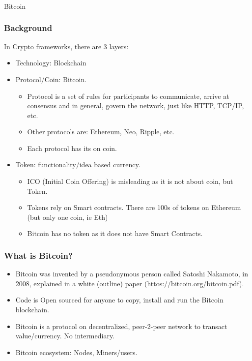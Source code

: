 \begin{frame}[fragile]\frametitle{}
\begin{center}
{\Large Bitcoin}
\end{center}
\end{frame}

\begin{frame}[fragile]\frametitle{Background}
In Crypto frameworks, there are 3 layers:
\begin{itemize}
\item Technology: Blockchain
\item Protocol/Coin: Bitcoin. 
\begin{itemize}
\item Protocol is a set of rules for participants to communicate, arrive at consensus and in general, govern the network, just like HTTP, TCP/IP, etc. 
\item Other protocols are: Ethereum, Neo, Ripple, etc. 
\item Each protocol has its on coin.
\end{itemize}
\item Token: functionality/idea based currency.
\begin{itemize}
\item ICO (Initial Coin Offering) is misleading as it is not about coin, but Token.
\item Tokens rely on Smart contracts. There are 100s of tokens on Ethereum (but only one coin, ie Eth)
\item Bitcoin has no token as it does not have Smart Contracts.
\end{itemize}
\end{itemize}
\end{frame}

\begin{frame}[fragile]\frametitle{What is Bitcoin?}
\begin{itemize}
\item Bitcoin was invented by a pseudonymous person called Satoshi Nakamoto, in 2008, explained in a white (outline) paper (httos://bitcoin.org/bitcoin.pdf).
\item Code is Open sourced for anyone to copy, install and run the Bitcoin blockchain.
\item Bitcoin is a protocol on decentralized, peer-2-peer network to transact value/currency. No intermediary.
\item Bitcoin ecosystem: Nodes, Miners/users.
\end{itemize}
\end{frame}

